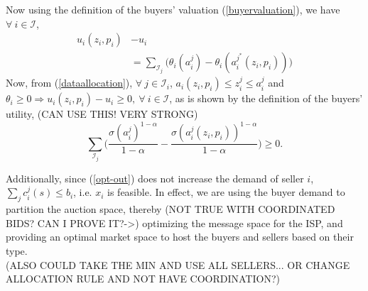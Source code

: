 \documentclass[12pt]{article}
\theoremstyle{definition}
\newcommand{\mcI}{\mathcal{I}}
\begin{document}
\begin{multicols}{2}
Now using the definition of
the buyers' valuation (\ref{buyervaluation}), we have $\forall \ i \in\mcI$,
\begin{align*}
    u_i(z_i,p_i) &- u_i \\
    &=\displaystyle\sum_{\mcI_j}\bigg(\theta_i(a_i^j)-
\theta_i(a_i^{j^*}(z_i,p_i))\bigg) 
\end{align*}
Now, from (\ref{dataallocation}), $\forall \ j\in\mcI_i$, $a_i(z_i,p_i) \le
z_i^j \le a_i^j$ and $\theta_i\ge 0 \Rightarrow u_i(z_i,p_i) - u_i \ge 0,
\ \forall \ i\in \mcI$, as is shown by the definition of the buyers' utility,
(CAN USE THIS! VERY STRONG)
$$
     \sum_{\mcI_j}\bigg(\frac{\sigma (a_i^j)^{1-\alpha}}{1-\alpha}
-\frac{\sigma (a_i^j(z_i,p_i))^{1-\alpha}}{1-\alpha}\bigg)
     \ge 0.
$$

Additionally, since (\ref{opt-out}) does
not increase the demand of seller $i$, $\sum_j c_i^j(s) \le b_i$, i.e. $x_i$ is feasible.
In effect, we are using the buyer demand
to partition the auction space, thereby (NOT TRUE WITH COORDINATED BIDS? CAN I
PROVE IT?->) optimizing the message space for the
ISP, and providing an optimal market space to host the buyers and sellers based
on their type. \\
(ALSO COULD TAKE THE MIN AND USE ALL SELLERS... OR CHANGE ALLOCATION RULE AND
NOT HAVE COORDINATION?)


\end{multicols}
\end{document}
